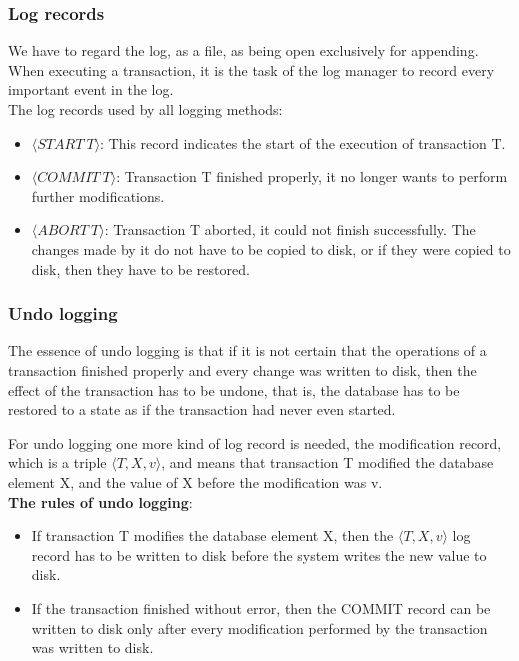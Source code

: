 \documentclass[margin=0px]{article}
\begin{document}
\subsubsection{Log records}

We have to regard the log, as a file, as being open exclusively for appending. When executing a transaction, it is the task of the log manager
to record every important event in the log.\\

\noindent The log records used by all logging methods:
\begin{itemize}
    \item	$\langle START \ T \rangle$: This record indicates the start of the execution of transaction T.
    \item	$\langle COMMIT \ T \rangle$: Transaction T finished properly, it no longer wants to perform further modifications.
    \item	$\langle ABORT \ T \rangle$: Transaction T aborted, it could not finish successfully. The changes made by it
          do not have to be copied to disk, or if they were copied to disk, then they have to be restored.
\end{itemize}

\subsubsection{Undo logging}

The essence of undo logging is that if it is not certain that the operations of a transaction finished properly and every change
was written to disk, then the effect of the transaction has to be undone, that is, the database has to be restored to a state
as if the transaction had never even started.

For undo logging one more kind of log record is needed, the modification record, which is a triple $\langle T,X,v\rangle$,
and means that transaction T modified the database element X, and the value of X before the modification was v.\\

\noindent \textbf{The rules of undo logging}:
\begin{itemize}
    \item	If transaction T modifies the database element X, then the $\langle T,X,v\rangle$ log record has to be
          written to disk before the system writes the new value to disk.

    \item	If the transaction finished without error, then the COMMIT record can be written to disk only after
          every modification performed by the transaction was written to disk.
\end{itemize}
\end{document}
